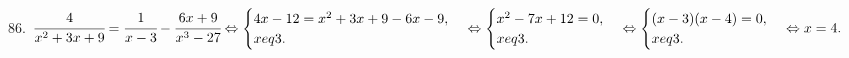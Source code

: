 86. $\cfrac{4}{x^2+3x+9}=\cfrac{1}{x-3}-\cfrac{6x+9}{x^3-27}\Leftrightarrow \begin{cases} 4x-12=x^2+3x+9-6x-9,\\ x
eq3.\end{cases}
\Leftrightarrow \begin{cases} x^2-7x+12=0,\\ x
eq3.\end{cases}\Leftrightarrow \begin{cases} (x-3)(x-4)=0,\\ x
eq3.\end{cases}\Leftrightarrow
x=4.$\\
